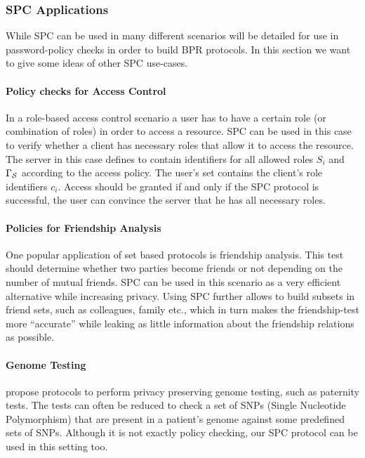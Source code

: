 \subsubsection{SPC Applications}\label{sec:generalisation}
While \ac{SPC} can be used in many different scenarios will be detailed for use in password-policy checks in order to build \ac{BPR} protocols.
In this section we want to give some ideas of other \ac{SPC} use-cases.

\paragraph{Policy checks for Access Control}
In a role-based access control scenario \cite{FerraioloK09} a user has to have a certain role (or combination of roles) in order to access a resource.
\ac{SPC} can be used in this case to verify whether a client has necessary roles that allow it to access the resource.
The server in this case defines \cS to contain identifiers for all allowed roles $S_i$ and $\Gamma_\mathcal{S}$ according to the access policy.
The user's set \cC contains the client's role identifiers $c_i$.
Access should be granted if and only if the \ac{SPC} protocol is successful, \ie the user can convince the server that he has all necessary roles.

\paragraph{Policies for Friendship Analysis}
One popular application of set based protocols is friendship analysis.
This test should determine whether two parties become friends or not depending on the number of mutual friends.
\ac{SPC} can be used in this scenario as a very efficient alternative while increasing privacy.
Using \ac{SPC} further allows to build subsets in friend sets, such as colleagues, family etc., which in turn makes the friendship-test more ``accurate'' while leaking as little information about the friendship relations as possible.

\paragraph{Genome Testing}
\citet{BaldiBCGT11} propose protocols to perform privacy preserving genome testing, such as paternity tests. 
The tests can often be reduced to check a set of SNPs (Single Nucleotide Polymorphism) that are present in a patient's genome against some predefined sets of SNPs. Although it is not exactly policy checking, our \ac{SPC} protocol can be used in this setting too. 


